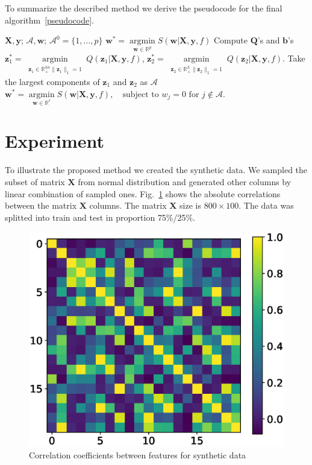 \documentclass[a4paper,12pt]{article}
\theoremstyle{plain} %
\theoremstyle{definition} %
\theoremstyle{remark} %
\newcommand{\bb}{\mathbf{b}}
\newcommand{\bw}{\mathbf{w}}
\newcommand{\bQ}{\mathbf{Q}}
\newcommand{\by}{\mathbf{y}}
\newcommand{\bz}{\mathbf{z}}
\newcommand{\bX}{\mathbf{X}}
\newcommand{\cA}{\mathcal{A}}
\newcommand{\bbR}{\mathbb{R}}
\newcommand{\argmin}{\mathop{\arg \min}\limits}
\begin{document}
	To summarize the described method we derive the pseudocode for the final algorithm~\ref{pseudocode}.
	
	
	\begin{algorithm}[h]
		\caption{}
		\label{pseudocode}
		\begin{algorithmic}[1]
			\REQUIRE $\bX, \by$;
			\ENSURE $\cA, \bw$;
			\STATE $\cA^0 = \{1, \dots, p\}$
			\STATE $\bw^* = \argmin_{\bw \in \bbR^p} S(\bw | \bX, \by, f)$
			\vspace{0.1cm}
			\STATE Compute $\bQ$'s and $\bb$'s			
			\vspace{0.1cm}
			\STATE 
			$\bz_1^* = \argmin_{\substack{\bz_1 \in \bbR^{hn}_{+} \| \bz_1 \|_1 = 1}} Q(\bz_1 | \bX, \by, f)$, \quad
			$\bz_2^* = \argmin_{\substack{ \bz_2 \in \bbR^{h}_{+} \| \bz_2 \|_1 = 1}} Q(\bz_2 | \bX, \by, f)$.			
			\vspace{0.1cm}
			\STATE Take the largest components of $\bz_1$ and $\bz_2$ as $\cA$
			\vspace{0.1cm}
			\STATE $\bw^* = \argmin_{\bw \in \bbR^r} S(\bw | \bX, \by, f), \quad \text{subject to } w_j = 0 \text{ for } j \notin \cA.$
		\end{algorithmic}
	\end{algorithm}

	\section*{Experiment}
	
	To illustrate the proposed method we created the synthetic data. 
	We sampled the subset of matrix $\bX$ from normal distribution and generated other columns by linear combination of sampled ones. 
	Fig.~\ref{fig:corr_matrix} shows the absolute correlations between the matrix $\bX$ columns.
	The matrix $\bX$ size is $800 \times 100$. 
	The data was splitted into train and test in proportion 75\%/25\%.
	
	\begin{figure}[h]
		\centering
		\includegraphics[width=0.7\linewidth]{figs/corr.eps}
		\caption{Correlation coefficients between features for synthetic data}
		\label{fig:corr_matrix}
	\end{figure}
\end{document}
